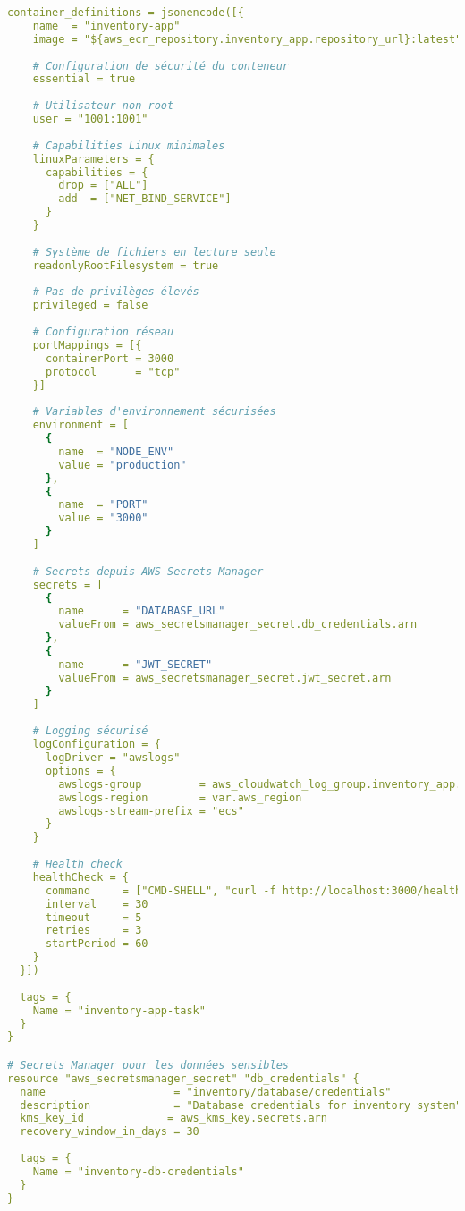\documentclass[12pt,a4paper]{report}
\begin{document}
\begin{lstlisting}[language=YAML, caption=Infrastructure as Code sécurisée avec Terraform]
  container_definitions = jsonencode([{
    name  = "inventory-app"
    image = "${aws_ecr_repository.inventory_app.repository_url}:latest"
    
    # Configuration de sécurité du conteneur
    essential = true
    
    # Utilisateur non-root
    user = "1001:1001"
    
    # Capabilities Linux minimales
    linuxParameters = {
      capabilities = {
        drop = ["ALL"]
        add  = ["NET_BIND_SERVICE"]
      }
    }
    
    # Système de fichiers en lecture seule
    readonlyRootFilesystem = true
    
    # Pas de privilèges élevés
    privileged = false
    
    # Configuration réseau
    portMappings = [{
      containerPort = 3000
      protocol      = "tcp"
    }]
    
    # Variables d'environnement sécurisées
    environment = [
      {
        name  = "NODE_ENV"
        value = "production"
      },
      {
        name  = "PORT"
        value = "3000"
      }
    ]
    
    # Secrets depuis AWS Secrets Manager
    secrets = [
      {
        name      = "DATABASE_URL"
        valueFrom = aws_secretsmanager_secret.db_credentials.arn
      },
      {
        name      = "JWT_SECRET"
        valueFrom = aws_secretsmanager_secret.jwt_secret.arn
      }
    ]
    
    # Logging sécurisé
    logConfiguration = {
      logDriver = "awslogs"
      options = {
        awslogs-group         = aws_cloudwatch_log_group.inventory_app.name
        awslogs-region        = var.aws_region
        awslogs-stream-prefix = "ecs"
      }
    }
    
    # Health check
    healthCheck = {
      command     = ["CMD-SHELL", "curl -f http://localhost:3000/health || exit 1"]
      interval    = 30
      timeout     = 5
      retries     = 3
      startPeriod = 60
    }
  }])
  
  tags = {
    Name = "inventory-app-task"
  }
}

# Secrets Manager pour les données sensibles
resource "aws_secretsmanager_secret" "db_credentials" {
  name                    = "inventory/database/credentials"
  description             = "Database credentials for inventory system"
  kms_key_id             = aws_kms_key.secrets.arn
  recovery_window_in_days = 30
  
  tags = {
    Name = "inventory-db-credentials"
  }
}


\end{lstlisting}
\end{document}
